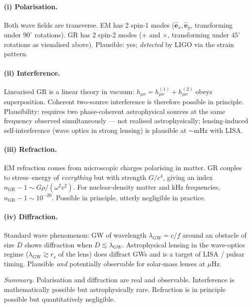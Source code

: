 \documentclass[11pt]{article}
\begin{document}
\paragraph{(i) Polarisation.}
Both wave fields are transverse. EM has 2 spin-1 modes ($\hat{\bm e}_x,\hat{\bm e}_y$, transforming under $90^\circ$ rotations). GR has 2 spin-2 modes ($+$ and $\times$, transforming under $45^\circ$ rotations as visualised above). Plausible: yes; \emph{detected} by LIGO via the strain pattern.

\paragraph{(ii) Interference.}
Linearised GR is a linear theory in vacuum: $h_{\mu\nu}=h_{\mu\nu}^{(1)}+h_{\mu\nu}^{(2)}$ obeys superposition. Coherent two-source interference is therefore possible in principle. Plausibility: requires two phase-coherent astrophysical sources at the same frequency observed simultaneously --- not realised astrophysically; lensing-induced self-interference (wave optics in strong lensing) is plausible at $\sim$mHz with LISA.

\paragraph{(iii) Refraction.}
EM refraction comes from microscopic charges polarising in matter. GR couples to stress--energy of \emph{everything} but with strength $G/c^4$, giving an index $n_{\text{GR}}-1\sim G\rho/(\omega^2 c^2)$. For nuclear-density matter and kHz frequencies, $n_{\text{GR}}-1\sim 10^{-20}$. Possible in principle, utterly negligible in practice. 

\paragraph{(iv) Diffraction.}
Standard wave phenomenon: GW of wavelength $\lambda_{\text{GW}}=c/f$ around an obstacle of size $D$ shows diffraction when $D\lesssim\lambda_{\text{GW}}$. Astrophysical lensing in the wave-optics regime ($\lambda_{\text{GW}}\gtrsim r_s$ of the lens) does diffract GWs and is a target of LISA / pulsar timing. Plausible \emph{and} potentially observable for solar-mass lenses at $\mu$Hz.

\medskip
\noindent\emph{Summary.} Polarisation and diffraction are real and observable. Interference is mathematically possible but astrophysically rare. Refraction is in principle possible but quantitatively negligible.
\end{document}

